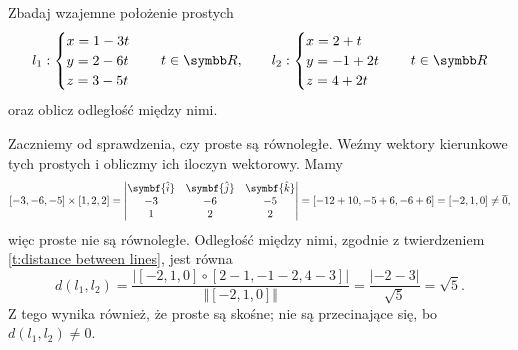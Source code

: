 \begin{example}
    Zbadaj wzajemne położenie prostych
    \[ l_1 : \begin{cases}
        x = 1 - 3t \\
        y = 2 - 6t \\
        z = 3 - 5t
    \end{cases} \quad t \in \RR, \qquad
    l_2 : \begin{cases}
        x = 2 + t \\
        y = -1 + 2t \\
        z = 4 + 2t
    \end{cases} \quad t \in \RR \]
    oraz oblicz odległość między nimi.
\end{example}
\begin{solution}
    Zaczniemy od sprawdzenia, czy proste są równoległe. Weźmy wektory kierunkowe tych prostych i obliczmy ich iloczyn wektorowy. Mamy
    \[ [-3, -6, -5] \times [1, 2, 2] = \begin{vmatrix}
        \symbf{\hat{i}} & \symbf{\hat{j}} & \symbf{\hat{k}} \\
        -3 & -6 & -5 \\
        1 & 2 & 2
    \end{vmatrix} = [-12 + 10, -5 + 6, -6 + 6] = [-2, 1, 0] \neq \ol{0}, \]
    więc proste nie są równoległe. Odległość między nimi, zgodnie z twierdzeniem \ref{t:distance between lines}, jest równa
    \[ d(l_1, l_2) = \frac{|[-2, 1, 0] \circ [2-1, -1-2, 4-3]|}{\Vert[-2, 1, 0]\Vert} = \frac{|-2 - 3|}{\sqrt{5}} = \sqrt{5}. \]
    Z tego wynika również, że proste są skośne; nie są przecinające się, bo $d(l_1, l_2) \neq 0$.
\end{solution}


